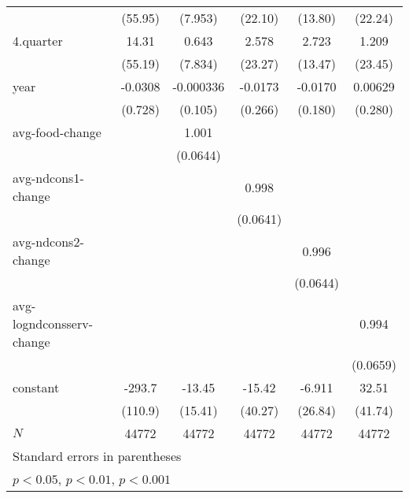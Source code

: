 \begin{table}[!h]
\begin{tabular}{l*{5}{c}}
            &     (55.95)         &     (7.953)         &     (22.10)         &     (13.80)         &     (22.24)         \\
4.quarter   &       14.31         &       0.643         &       2.578         &       2.723         &       1.209         \\
            &     (55.19)         &     (7.834)         &     (23.27)         &     (13.47)         &     (23.45)         \\
year        &     -0.0308         &   -0.000336         &     -0.0173         &     -0.0170         &     0.00629         \\
            &     (0.728)         &     (0.105)         &     (0.266)         &     (0.180)         &     (0.280)         \\
avg-food-change&                     &       1.001\sym{***}&                     &                     &                     \\
            &                     &    (0.0644)         &                     &                     &                     \\
avg-ndcons1-change&                     &                     &       0.998\sym{***}&                     &                     \\
            &                     &                     &    (0.0641)         &                     &                     \\
avg-ndcons2-change&                     &                     &                     &       0.996\sym{***}&                     \\
            &                     &                     &                     &    (0.0644)         &                     \\
avg-logndconsserv-change&                     &                     &                     &                     &       0.994\sym{***}\\
            &                     &                     &                     &                     &    (0.0659)         \\
constant    &      -293.7\sym{**} &      -13.45         &      -15.42         &      -6.911         &       32.51         \\
            &     (110.9)         &     (15.41)         &     (40.27)         &     (26.84)         &     (41.74)         \\
\hline
\(N\)       &       44772         &       44772         &       44772         &       44772         &       44772         \\
\hline\hline
\multicolumn{6}{l}{\footnotesize Standard errors in parentheses}\\
\multicolumn{6}{l}{\footnotesize \sym{*} \(p<0.05\), \sym{**} \(p<0.01\), \sym{***} \(p<0.001\)}\\
\end{tabular}
\end{table}
